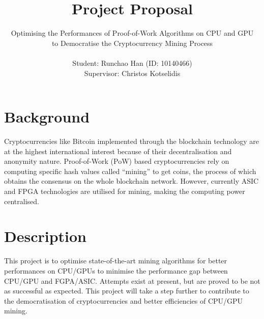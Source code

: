 \documentclass[11pt]{article}
\begin{document}
\title{Project Proposal}
\author{Optimising the Performances of Proof-of-Work Algorithms on CPU and GPU\\
to Democratise the Cryptocurrency Mining Process \\
\\
Student: Runchao Han (ID: 10140466)\\
Supervisor: Christos Kotselidis \\
}
\maketitle

\section{Background}

Cryptocurrencies like Bitcoin\cite{nakamoto2008bitcoin} implemented through the blockchain technology are at the highest international interest because of their decentralisation and anonymity nature. Proof-of-Work (PoW)\cite{laurie2004proof} based cryptocurrencies rely on computing specific hash values called ``mining'' to get coins, the process of which obtains the consensus on the whole blockchain network\cite{nakamoto2008bitcoin}. However, currently ASIC and FPGA technologies are utilised for mining, making the computing power centralised.

\section{Description}


This project is to optimise state-of-the-art mining algorithms for better performances on CPU/GPUs to minimise the performance gap between CPU/GPU and FGPA/ASIC. Attempts\cite{percival2016scrypt}\cite{dagger}\cite{memohash}\cite{rivest1996time} exist at present, but are proved to be not as successful as expected. This project will take a step further to contribute to the democratisation of cryptocurrencies and better efficiencies of CPU/GPU mining. 
\end{document}
